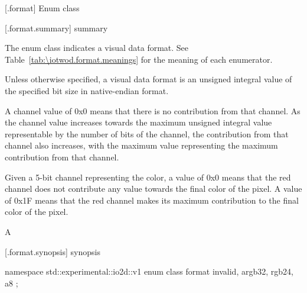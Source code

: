  [\iotwod.format] {Enum class }

 [\iotwod.format.summary] { summary}

\pnum
The  enum class indicates a visual data format. See Table~\ref{tab:\iotwod.format.meanings} for 
the meaning of each  enumerator.

%
%
\pnum
Unless otherwise specified, a visual data format is an unsigned integral
value of the specified bit size in native-endian format.

%
\pnum
A channel value of 0x0 means that there is no contribution from that channel. 
As the channel value increases towards the maximum unsigned integral value 
representable by the number of bits of the channel, the contribution from that 
channel also increases, with the maximum value representing the maximum
contribution from that channel.
\begin{example}
Given a 5-bit channel representing the color, a value of 0x0 means that the red channel does not 
contribute any value towards the final color of the pixel. A value of 0x1F 
means that the red channel makes its maximum contribution to the final color of 
the pixel.

A
\end{example}

 [\iotwod.format.synopsis] { synopsis}

\begin{codeblock}
namespace std::experimental::io2d::v1 {
  enum class format {
    invalid,
    argb32,
    rgb24,
    a8
  };
}
\end{codeblock}

